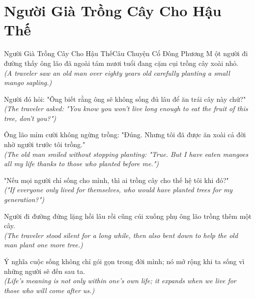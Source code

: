 \section{Người Già Trồng Cây Cho Hậu Thế}
\begin{truyen}{Người Già Trồng Cây Cho Hậu Thế}{Câu Chuyện Cổ Đông Phương}
M ột người đi đường thấy ông lão đã ngoài tám mươi tuổi đang cặm cụi trồng cây xoài nhỏ.\\
\textit{(A traveler saw an old man over eighty years old carefully planting a small mango sapling.)}

Người đó hỏi: "Ông biết rằng ông sẽ không sống đủ lâu để ăn trái cây này chứ?"\\
\textit{(The traveler asked: "You know you won't live long enough to eat the fruit of this tree, don't you?")}

Ông lão mỉm cười không ngừng trồng: "Đúng. Nhưng tôi đã được ăn xoài cả đời nhờ người trước tôi trồng."\\
\textit{(The old man smiled without stopping planting: "True. But I have eaten mangoes all my life thanks to those who planted before me.")}

"Nếu mọi người chỉ sống cho mình, thì ai trồng cây cho thế hệ tôi khi đó?"\\
\textit{("If everyone only lived for themselves, who would have planted trees for my generation?")}

Người đi đường đứng lặng hồi lâu rồi cũng cúi xuống phụ ông lão trồng thêm một cây.\\
\textit{(The traveler stood silent for a long while, then also bent down to help the old man plant one more tree.)}

\end{truyen}
\begin{baihoc}
  Ý nghĩa cuộc sống không chỉ gói gọn trong đời mình; nó mở rộng khi ta sống vì những người sẽ đến sau ta.\\
  \textit{(Life's meaning is not only within one's own life; it expands when we live for those who will come after us.)}
\end{baihoc}

